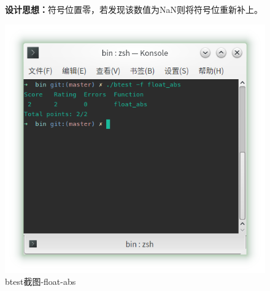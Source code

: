 \begin{figure}[H]
\begin{minipage}[c]{0.5\linewidth}
\textbf{设计思想：}符号位置零，若发现该数值为NaN则将符号位重新补上。
\end{minipage}
\begin{minipage}[c]{0.4\linewidth}
\centering
\includegraphics[width=0.9\linewidth]{figures/float_abs}
\caption{btest截图-float-abs}
\label{fig:float-abs}
\end{minipage}
\end{figure}



